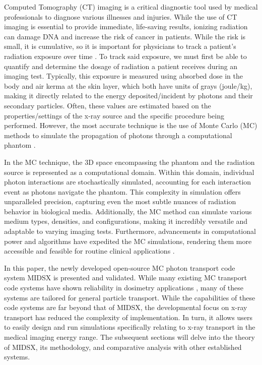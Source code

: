 \par Computed Tomography (CT) imaging is a critical diagnostic tool used by medical professionals to diagnose various illnesses and injuries. While the use of CT imaging is essential to provide immediate, life-saving results, ionizing radiation can damage DNA and increase the risk of cancer in patients. While the risk is small, it is cumulative, so it is important for physicians to track a patient's radiation exposure over time \cite{lauer2009elements}. To track said exposure, we must first be able to quantify and determine the dosage of radiation a patient receives during an imaging test. Typically, this exposure is measured using absorbed dose in the body and air kerma at the skin layer, which both have units of grays (joule/kg), making it directly related to the energy deposited/incident by photons and their secondary particles. Often, these values are estimated based on the properties/settings of the x-ray source and the specific procedure being performed. However, the most accurate technique is the use of Monte Carlo (MC) methods to simulate the propagation of photons through a computational phantom \cite{essmedphys2012}. 
\par In the MC technique, the 3D space encompassing the phantom and the radiation source is represented as a computational domain. Within this domain, individual photon interactions are stochastically simulated, accounting for each interaction event as photons navigate the phantom. This complexity in simulation offers unparalleled precision, capturing even the most subtle nuances of radiation behavior in biological media. Additionally, the MC method can simulate various medium types, densities, and configurations, making it incredibly versatile and adaptable to varying imaging tests. Furthermore, advancements in computational power and algorithms have expedited the MC simulations, rendering them more accessible and feasible for routine clinical applications \cite{fernandez_bosman_validation_2021}.
\par In this paper, the newly developed open-source MC photon transport code system MIDSX is presented and validated. While many existing MC transport code systems have shown reliability in dosimetry applications \cite{fernandez_bosman_validation_2021, geant4valid2004}, many of these systems are tailored for general particle transport. While the capabilities of these code systems are far beyond that of MIDSX, the developmental focus on x-ray transport has reduced the complexity of implementation. In turn, it allows users to easily design and run simulations specifically relating to x-ray transport in the medical imaging energy range. The subsequent sections will delve into the theory of MIDSX, its methodology, and comparative analysis with other established systems.